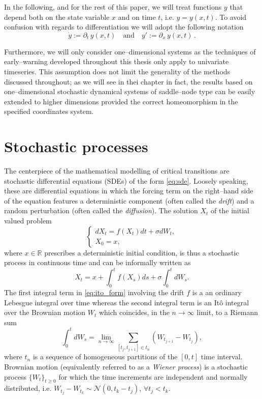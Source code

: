 In the following, and for the rest of this paper, we will treat functions $y$ that depend both on the state variable $x$ and on time $t$, i.e. $y=y(x,t)$.
To avoid confusion with regards to differentiation we will adopt the following notation
%
\begin{equation*}
        \dot{y}:=\partial_t\,y(x,t)\quad \text{and}\quad y':=\partial_x\,y(x,t)\,.
\end{equation*}
%

Furthermore, we will only consider one--dimensional systems as the techniques of early--warning developed throughout this thesis only apply to univariate timeseries.
This assumption does not limit the generality of the methods discussed throughout; as we will see in thei chapter in fact, the results based on one--dimensional stochastic dynamical systems of saddle--node type can be easily extended to higher dimensions provided the correct homeomorphism in the specified coordinates system.

\section{Stochastic processes}\label{sec:stochastic_processes}

The centerpiece of the mathematical modelling of critical transitions are stochastic differential equations (SDEs) of the form \eqref{eq:sde}.
Loosely speaking, these are differential equations in which the forcing term on the right--hand side of the equation features a deterministic component (often called the \emph{drift}) and a random perturbation (often called the \emph{diffusion}).
The solution $X_t$ of the initial valued problem
%
\begin{equation}\label{eq:ivp}
   \begin{cases}
     dX_t = f(X_t)dt + \sigma dW_t, \\
     X_0 = x, 
   \end{cases}
\end{equation}
%
where $x\in\mathbb{R}$ prescribes a deterministic initial condition, is thus a stochastic process in continuous time and can be informally written as
%
\begin{equation}\label{eq:ito_form}
  X_t = x + \int_{0}^{t}f(X_s)ds + \sigma\int_{0}^{t}dW_s.
\end{equation}
%
The first integral term in \eqref{eq:ito_form} involving the drift $f$ is a an ordinary Lebesgue integral over time whereas the second integral term is an It\^{o} integral over the Brownian motion $W_t$ which coincides, in the $n\to\infty$ limit, to a Riemann sum
%
\begin{equation}\label{eq:ito_integral}
  \int_{0}^{t}dW_s = \lim_{n\to\infty}\sum_{[t_j,t_{j+1}]\in t_n}^{}(W_{t_{j+1}} - W_{t_j}),
\end{equation}
%
where $t_n$ is a sequence of homogeneous partitions of the $[0,t]$ time interval.
Brownian motion (equivalently referred to as a \emph{Wiener process}) is a stochastic process $\{W_t\}_{t\geq0}$ for which the time increments are independent and normally distributed, i.e. $W_{t_j} - W_{t_k}\sim \mathcal{N}(0,t_k - t_j)$, $\forall t_j < t_k$.

